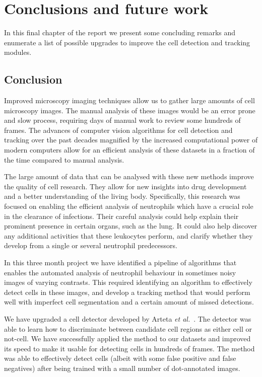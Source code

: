 		
\chapter{Conclusions and future work}
\label{chap:conclusion}

In this final chapter of the report we present some concluding remarks and enumerate a list of possible upgrades to improve the cell detection and tracking modules.

\section{Conclusion}
\label{sec:conclusion_conclusion}

Improved microscopy imaging techniques allow us to gather large amounts of cell microscopy images. The manual analysis of these images would be an error prone and slow process, requiring days of manual work to review some hundreds of frames. The advances of computer vision algorithms for cell detection and tracking over the past decades magnified by the increased computational power of modern computers allow for an efficient analysis of these datasets in a fraction of the time compared to manual analysis.

The large amount of data that can be analysed with these new methods improve the quality of cell research. They allow for new insights into drug development and a better understanding of the living body. Specifically, this research was focused on enabling the efficient analysis of neutrophils which have a crucial role in the clearance of infections. Their careful analysis could help explain their prominent presence in certain organs, such as the lung. It could also help discover any additional activities that these leukocytes perform, and clarify whether they develop from a single or several neutrophil predecessors.

In this three month project we have identified a pipeline of algorithms that enables the automated analysis of neutrophil behaviour in sometimes noisy images of varying contrasts. This required identifying an algorithm to effectively detect cells in these images, and develop a tracking method that would perform well with imperfect cell segmentation and a certain amount of missed detections.

We have upgraded a cell detector developed by Arteta \emph{et al.}~\cite{arteta12}. The detector was able to learn how to discriminate between candidate cell regions as either cell or not-cell. We have successfully applied the method to our datasets and improved its speed to make it usable for detecting cells in hundreds of frames. The method was able to effectively detect cells (albeit with some false positive and false negatives) after being trained with a small number of dot-annotated images.

